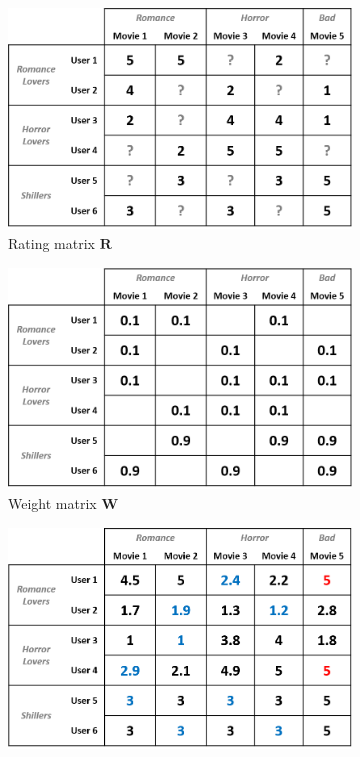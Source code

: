 \documentclass[master,english,final]{kaist-ucs}
\begin{document}
\begin{figure}[h]
    \centering
    \begin{subfigure}[b]{0.3\textwidth}
        \centering
        \includegraphics[width=\textwidth]{figure/mf_after_rating}
        \caption{Rating matrix $\bm{R}$}
    \end{subfigure}
    \begin{subfigure}[b]{0.3\textwidth}
        \centering
        \includegraphics[width=\textwidth]{figure/wmf_bad_weight}
        \caption{Weight matrix $\bm{W}$}
        \label{wmf_bad_weight}
    \end{subfigure}
    \begin{subfigure}[b]{0.3\textwidth}
        \centering
        \includegraphics[width=\textwidth]{figure/wmf_bad_prediction}

\end{subfigure}
\end{figure}
\end{document}
